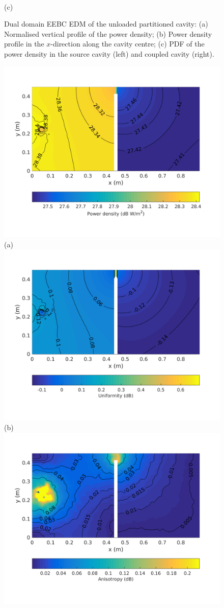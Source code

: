 \documentclass[a4paper]{article}
\numberwithin{equation}{section}
\begin{document}
\begin{figure}[ht]
\begin{center}
\\
{\footnotesize (c)}\\
\vspace{-2mm}
\caption{\label{fg:partemptysdm_profs} Dual domain EEBC EDM of the unloaded partitioned cavity: (a) Normalised vertical profile of the power density; 
(b) Power density profile in the $x$-direction along the cavity centre; (c) PDF of the power density in the source cavity (left) and coupled cavity (right).}
\end{center}
\end{figure}

\begin{figure}[ht]
\begin{center}
\includegraphics[trim={0 13mm 0 12mm},clip,width=0.53\linewidth]{figures/DDM-EEBC_3D_DU_PowerDensityMap}\\
{\footnotesize (a)}\\
\vspace{2mm}
\includegraphics[trim={0 14mm 0 12mm},clip,width=0.53\linewidth]{figures/DDM-EEBC_3D_DU_EnergyDensityUniformityMap}\\
{\footnotesize (b)}\\
\vspace{2mm}
\includegraphics[trim={0 14mm 0 12mm},clip,width=0.53\linewidth]{figures/DDM-EEBC_3D_DU_EnergyDensityAnisotropyMap}\\

\end{center}
\end{figure}
\end{document}
